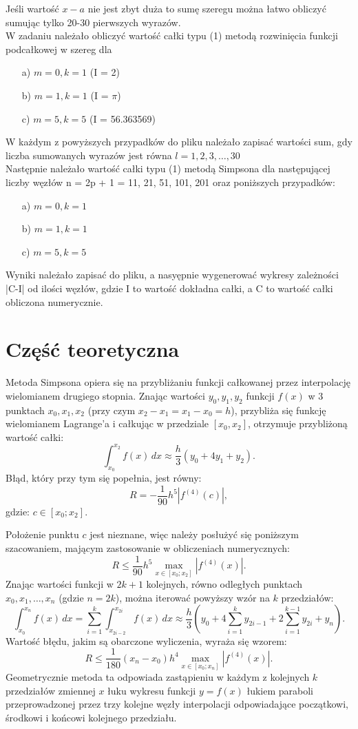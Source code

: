 \documentclass{article}
\begin{document}
\noindent
Jeśli wartość \(x-a\) nie jest zbyt duża to sumę szeregu można łatwo obliczyć sumując tylko 20-30 pierwszych wyrazów.
\\
\noindent
W zadaniu należało obliczyć wartość całki typu (1) metodą rozwinięcia funkcji podcałkowej w szereg dla
\begin{itemize}
    \item[a)] \(m = 0, k = 1\) (I = 2)
    \item[b)] \(m = 1, k = 1\) (I = $\pi$)
    \item[c)] \(m = 5, k = 5\) (I = 56.363569)
\end{itemize}
\noindent 
W każdym z powyższych przypadków do pliku należało zapisać wartości sum, gdy liczba sumowanych wyrazów jest równa \(l = 1, 2, 3, \dots, 30\) 
\\
\noindent
Następnie należało wartość całki typu (1) metodą Simpsona dla następującej liczby węzłów n = 2p + 1 = 11, 21, 51, 101, 201 oraz poniższych przypadków:
\begin{itemize}
    \item[a)] \(m = 0, k = 1\)
    \item[b)] \(m = 1, k = 1\)
    \item[c)] \(m = 5, k = 5\)
\end{itemize}
\noindent
Wyniki należało zapisać do pliku,  a nasyępnie wygenerować wykresy zależności |C-I| od ilości węzłów, gdzie I to wartość dokładna całki, a C to wartość całki obliczona numerycznie. 

\section{Część teoretyczna}
Metoda Simpsona opiera się na przybliżaniu funkcji całkowanej przez interpolację wielomianem drugiego stopnia.
\noindent
Znając wartości \(y_0, y_1, y_2\) funkcji \(f(x)\) w 3 punktach \(x_0, x_1, x_2\) (przy czym \(x_2 - x_1 = x_1 - x_0 = h\)), przybliża się funkcję wielomianem Lagrange'a i całkując w przedziale \([x_0, x_2]\), otrzymuje przybliżoną wartość całki:
\[
\int_{x_0}^{x_2} f(x) \, dx \approx \frac{h}{3} (y_0 + 4y_1 + y_2).
\]
Błąd, który przy tym się popełnia, jest równy:
\[
R = -\frac{1}{90} h^5 |f^{(4)}(c)|,
\]
gdzie:
\(c \in [x_0; x_2]\).

\noindent
Położenie punktu \(c\) jest nieznane, więc należy posłużyć się poniższym szacowaniem, mającym zastosowanie w obliczeniach numerycznych:
\[
R \leq \frac{1}{90} h^5 \max_{x\in[x_0;x_2]} |f^{(4)}(x)|.
\]
Znając wartości funkcji w \(2k + 1\) kolejnych, równo odległych punktach \(x_0, x_1, \ldots, x_n\) (gdzie \(n = 2k\)), można iterować powyższy wzór na \(k\) przedziałów:
\[
\int_{x_0}^{x_n} f(x) \, dx = \sum_{i=1}^k \int_{x_{2i-2}}^{x_{2i}} f(x) \, dx \approx \frac{h}{3} \left( y_0 + 4 \sum_{i=1}^k y_{2i-1} + 2 \sum_{i=1}^{k-1} y_{2i} + y_n \right).
\]
Wartość błędu, jakim są obarczone wyliczenia, wyraża się wzorem:
\[
R \leq \frac{1}{180} (x_n - x_0) h^4 \max_{x\in[x_0;x_n]} |f^{(4)}(x)|.
\]
Geometrycznie metoda ta odpowiada zastąpieniu w każdym z kolejnych \(k\) przedziałów zmiennej \(x\) łuku wykresu funkcji \(y = f(x)\) łukiem paraboli przeprowadzonej przez trzy kolejne węzły interpolacji odpowiadające początkowi, środkowi i końcowi kolejnego przedziału.
\end{document}
